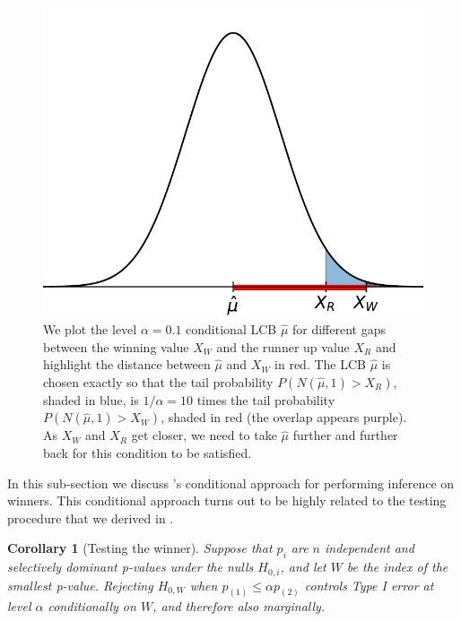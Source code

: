 \documentclass{article}
\newtheorem{corollary}{Corollary}
\begin{document}
\begin{figure}[]
{\begin{minipage}{0.33\textwidth}
    \end{minipage}\hfill
    \hspace{0.02\textwidth}
    \begin{minipage}{0.33\textwidth}
        \centering
        \includegraphics[width=\textwidth]{tail_prob_3.pdf}
    \end{minipage}
    }
    \caption{We plot the level $\alpha=0.1$ conditional LCB $\hat{\mu}$ for different gaps between the winning value $X_W$ and the runner up value $X_R$ and highlight the distance between $\hat{\mu}$ and $X_W$ in red. The LCB $\hat{\mu}$ is chosen exactly so that the tail probability $P(N(\hat{\mu}, 1) > X_R)$, shaded in blue, is $1/\alpha=10$ times the tail probability $P(N(\hat{\mu}, 1) > X_W)$, shaded in red (the overlap appears purple). As $X_W$ and $X_R$ get closer, we need to take $\hat{\mu}$ further and further back for this condition to be satisfied.}
    \label{fig:tail_prob}
\end{figure}

In this sub-section we discuss \cite{Fithian2017}'s conditional approach for performing inference on winners. This conditional approach turns out to be highly related to the testing procedure that we derived in . 

\begin{corollary}[Testing the winner]
    \label{cor:cond}
    Suppose that $p_i$ are $n$ independent and selectively dominant p-values under the nulls $H_{0, i}$, and let $W$ be the index of the smallest p-value. Rejecting $H_{0, W}$ when $p_{(1)} \leq \alpha p_{(2)}$ controls Type I error at level $\alpha$ conditionally on $W$, and therefore also marginally. 
\end{corollary}
\end{document}
